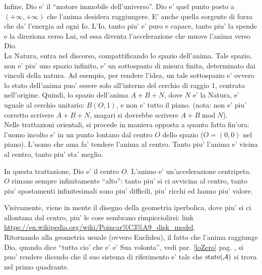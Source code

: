 Infine, Dio e' il ``motore immobile dell'universo''. Dio e' quel punto posto a $(+\infty, +\infty)$ che l'anima desidera raggiungere. E' anche quella sorgente di forza che da' l'energia ad ogni Io. L'Io, tanto piu' e' puro e capace, tanto piu' la spende e la direziona verso Lui, ed essa diventa l'accelerazione che muove l'anima verso Dio.\\

La Natura, entra nel discorso, compattificando lo spazio dell'anima. Tale spazio, non e' piu' uno spazio infinito, e' un sottospazio di misura finita, determinato dai vincoli della natura. Ad esempio, per rendere l'idea, un tale sottospazio e' 
ovvero lo stato dell'anima puo' essere solo all'interno del cerchio di raggio 1, centrato nell'origine. Quindi, lo spazio dell'anima $A+B+N$, dove $N$ e' la Natura, e' uguale al cerchio unitario: $B(O,1)$, e non e' tutto il piano. (nota: non e' piu' corretto scrivere $A+B+N$, magari si dovrebbe scrivere $A+B\;\textrm{mod}\;N$).\\

Nelle trattazioni orientali, si procede in maniera opposta a quanto fatto fin'ora: l'uomo incolto e' in un punto lontano dal centro $O$ dello spazio ($O=(0,0)$ nel piano). L'uomo che ama fa' tendere l'anima al centro. Tanto piu' l'anima e' vicina al centro, tanto piu' sta' meglio.

In questa trattazione, Dio e' il centro $O$. L'animo e' un'accelerazione centripeta. $O$ rimane sempre infinitamente ``alto'': tanto piu' si ci avvicina al centro, tanto piu' spostamenti infinitesimali sono piu' difficili, piu' ricchi ed hanno piu' valore.

Visivamente, viene in mente il disegno della geometria iperbolica, dove piu' si ci allontana dal centro, piu' le cose sembrano rimpicciolirsi: link  \url{https://en.wikipedia.org/wiki/Poincar\%C3\%A9\_disk\_model}.\\



Ritornando alla geometria usuale (ovvero Euclidea), il fatto che l'anima raggiunge Dio, quando dice ``tutto cio' che e' e' Sua volonta'', vedi par. \ref{loZero} pag. \pageref{loZero}, si puo' rendere dicendo che il suo sistema di riferimento e' tale che $\textrm{state}(\mathcal{A})$ si trova nel primo quadrante. 

